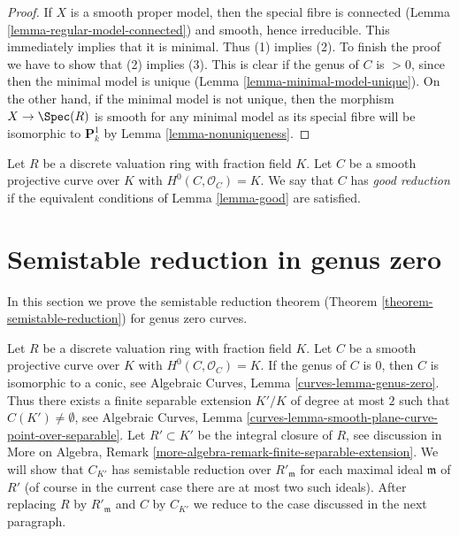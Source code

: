 \begin{proof}
If $X$ is a smooth proper model, then the special fibre is
connected (Lemma \ref{lemma-regular-model-connected})
and smooth, hence irreducible. This immediately implies that
it is minimal. Thus (1) implies (2). 
To finish the proof we have to show that (2) implies (3).
This is clear if the genus of $C$ is $> 0$, since then
the minimal model is unique (Lemma \ref{lemma-minimal-model-unique}).
On the other hand, if the minimal model is not unique, then
the morphism $X \to \Spec(R)$ is smooth for any minimal model
as its special fibre will be isomorphic to $\mathbf{P}^1_k$
by Lemma \ref{lemma-nonuniqueness}.
\end{proof}

\begin{definition}
\label{definition-good}
Let $R$ be a discrete valuation ring with fraction field $K$.
Let $C$ be a smooth projective curve over $K$ with $H^0(C, \mathcal{O}_C) = K$.
We say that $C$ has {\it good reduction} if the equivalent
conditions of Lemma \ref{lemma-good} are satisfied.
\end{definition}








\section{Semistable reduction in genus zero}
\label{section-semistable-reduction-genus-zero}

\noindent
In this section we prove the semistable reduction theorem
(Theorem \ref{theorem-semistable-reduction})
for genus zero curves.

\medskip\noindent
Let $R$ be a discrete valuation ring with fraction field $K$.
Let $C$ be a smooth projective curve over $K$ with $H^0(C, \mathcal{O}_C) = K$.
If the genus of $C$ is $0$, then $C$ is isomorphic to a conic,
see Algebraic Curves, Lemma \ref{curves-lemma-genus-zero}.
Thus there exists a finite separable extension $K'/K$ of
degree at most $2$ such that $C(K') \not = \emptyset$, see
Algebraic Curves, Lemma
\ref{curves-lemma-smooth-plane-curve-point-over-separable}.
Let $R' \subset K'$ be the integral closure of $R$, see
discussion in More on Algebra, Remark
\ref{more-algebra-remark-finite-separable-extension}.
We will show that $C_{K'}$ has semistable reduction
over $R'_{\mathfrak m}$ for each maximal ideal $\mathfrak m$ of $R'$
(of course in the current case there are at most two such ideals).
After replacing $R$ by $R'_{\mathfrak m}$ and $C$ by $C_{K'}$
we reduce to the case discussed in the next paragraph.

